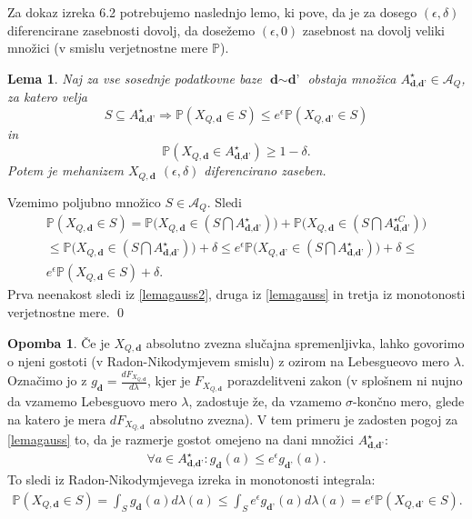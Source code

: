 \documentclass[12pt,a4paper]{amsart}
\theoremstyle{definition} %
\newtheorem{opomba}[definicija]{Opomba}
\theoremstyle{plain} %
\newtheorem{lema}[definicija]{Lema}
\begin{document}
Za dokaz izreka 6.2 potrebujemo naslednjo lemo, ki pove, da je za dosego $(\epsilon, \delta)$ diferencirane zasebnosti dovolj, da dosežemo $(\epsilon, 0)$ zasebnost na dovolj veliki množici (v smislu verjetnostne mere $\mathbb{P}$).
\begin{lema}
Naj za vse sosednje podatkovne baze $\textbf{d} \sim \textbf{d'}$ obstaja množica $A_{\textbf{d}, \textbf{d'}}^{\star} \in \mathcal{A}_Q$, za katero velja
\begin{equation}\label{lemagauss}
S \subseteq A_{\textbf{d}, \textbf{d'}}^{\star} \Rightarrow \mathbb{P}(X_{Q, \textbf{d}} \in S) \leq e^{\epsilon} \mathbb{P}(X_{Q, \textbf{d'}} \in S) \tag{8}
\end{equation}
in 
\begin{equation}\label{lemagauss2}
\mathbb{P}(X_{Q, \textbf{d}} \in A_{\textbf{d}, \textbf{d'}}^{\star}) \geq 1 - \delta. \tag{9}
\end{equation}
Potem je mehanizem $X_{Q, \textbf{d}}$ $(\epsilon, \delta)$ diferencirano zaseben.
\end{lema}
\proof 
Vzemimo poljubno množico $S \in \mathcal{A}_Q$. Sledi
\begin{gather*}
\mathbb{P}(X_{Q, \textbf{d}} \in S)  = \mathbb{P}\Big(X_{Q, \textbf{d}} \in (S \bigcap A_{\textbf{d}, \textbf{d'}}^{\star}) \Big)  + \mathbb{P}\Big(X_{Q, \textbf{d}} \in ( S \bigcap A_{\textbf{d}, \textbf{d'}}^{\star C} ) \Big) \\ \leq \mathbb{P}\Big(X_{Q, \textbf{d}} \in (S \bigcap A_{\textbf{d}, \textbf{d'}}^{\star}) \Big)  + \delta \leq e^{\epsilon} \mathbb{P}\Big(X_{Q, \textbf{d'}} \in (S \bigcap A_{\textbf{d}, \textbf{d'}}^{\star}) \Big)  + \delta \leq \\ e^{\epsilon} \mathbb{P}(X_{Q, \textbf{d}} \in S )  + \delta.
\end{gather*}
Prva neenakost sledi iz \eqref{lemagauss2}, druga iz \eqref{lemagauss} in tretja iz monotonosti verjetnostne mere.
\qed
\newline
\begin{opomba}
Če je $X_{Q, \textbf{d}}$ absolutno zvezna slučajna spremenljivka, lahko govorimo o njeni gostoti (v Radon-Nikodymjevem smislu) z ozirom na Lebesgueovo mero $\lambda$. Označimo jo z $g_{\textbf{d}} = \frac{dF_{X_{Q, \textbf{d}}}}{d \lambda}$, kjer je $F_{X_{Q, \textbf{d}}}$ porazdelitveni zakon (v splošnem ni nujno da vzamemo Lebesguovo mero $\lambda$, zadostuje že, da vzamemo $\sigma$-končno mero, glede na katero je mera $dF_{X_{Q, \textbf{d}}}$ absolutno zvezna). V tem primeru je zadosten pogoj za \eqref{lemagauss} to, da je razmerje gostot omejeno na dani množici $A_{\textbf{d}, \textbf{d'}}^{\star}$:
\begin{gather*}
\forall a \in A_{\textbf{d}, \textbf{d'}}^{\star} : g_{\textbf{d}} (a) \leq e^{\epsilon} g_{\textbf{d'}} (a).
\end{gather*}
To sledi iz Radon-Nikodymjevega izreka in monotonosti integrala:
\begin{gather*}
\mathbb{P}(X_{Q, \textbf{d}} \in S) = \int_{S} g_{\textbf{d}}(a) d\lambda(a) \leq \int_{S} e^{\epsilon} g_{\textbf{d'}}(a) d\lambda(a) = e^{\epsilon} \mathbb{P}(X_{Q, \textbf{d'}} \in S).
\end{gather*}
\end{opomba}
\end{document}
